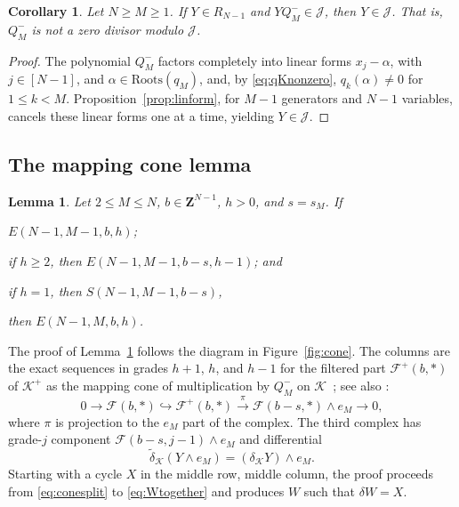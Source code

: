 \documentclass[12pt]{amsart}
\newtheorem{lemma}[theorem]{Lemma}
\newtheorem{corollary}[theorem]{Corollary}
\theoremstyle{definition}
\theoremstyle{remark}
\newcommand{\Z}{\mathbf Z}
\newcommand{\cJ}{\mathcal J}
\newcommand{\K}{\mathcal K}
\newcommand{\Kplus}{{{\mathcal K}^+}}
\newcommand{\FF}{\mathcal F}
\newcommand{\Roots}{\mathrm{Roots}}
\begin{document}
\begin{corollary}\label{cor:NotZeroDiv}
Let $N \geq M \geq 1$.  If $Y \in R_{N-1}$ and $YQ^-_M \in \cJ$,
then $Y \in \cJ$.  That is, $Q^-_M$ is not a zero divisor modulo $\cJ$.
\end{corollary}
\begin{proof}
The polynomial $Q^-_M$ factors completely into linear forms
$x_j - \alpha$, with $j \in [N-1]$, and $\alpha \in \Roots(q_M)$, and,
by \eqref{eq:qKnonzero},
 $q_k(\alpha) \neq 0$ for $1 \leq k < M$.
Proposition~\ref{prop:linform}, for $M-1$ generators and $N-1$ variables,
cancels these linear forms one at a time,
yielding $Y \in \cJ$.
\end{proof}


\subsection{The mapping cone lemma}\label{subsec:cone}
 
\begin{lemma}\label{lem:cone}
Let $2\le M\le N$, $b\in\Z^{N-1}$, $h > 0$, and $s=s_M$.  If
\begin{thmlist}
\item $E(N-1,M-1,b,h)$;
\item\label{it:coneplus}  if $h \geq 2$, then $E(N-1,M-1,b-s,h-1)$; and
\item\label{it:conezero} if $h = 1$, then $S(N-1,M-1,b-s)$,
\end{thmlist}
then $E(N-1,M,b,h)$.
\end{lemma}

The proof of Lemma~\ref{lem:cone} follows the diagram in Figure~\ref{fig:cone}.
The columns are the exact sequences in grades $h+1$, $h$, and $h-1$ 
for the filtered part $\FF^+(b, *)$ of $\Kplus$ as
the mapping cone of multiplication by $Q^-_M$ on $\K$~\cite[Cor.~17.11]{Eisenbud1995}; see also \cite[\S1.5 and Lemma~4.5.3]{Weibel}:
\begin{equation}\label{eq:exactcone}
0 \to \FF(b, *) \hookrightarrow \FF^+(b, *)\xrightarrow{\ \pi\ }
\FF(b-s, *)\wedge e_M \to 0,
\end{equation}
where $\pi$ is projection to the $e_M$ part of the complex.
The third complex has grade-$j$ component $\FF(b-s,j-1)\wedge e_M$
and differential 
\begin{equation}\label{eq:eMdelta}
{\tilde \delta}_\K(Y\wedge e_M)=(\delta_\K Y)\wedge e_M.
\end{equation}
Starting with a cycle $X$ in the middle row, middle column,
the proof proceeds from \eqref{eq:conesplit} to \eqref{eq:Wtogether}
and produces $W$ such that $\delta W = X$.
\end{document}
